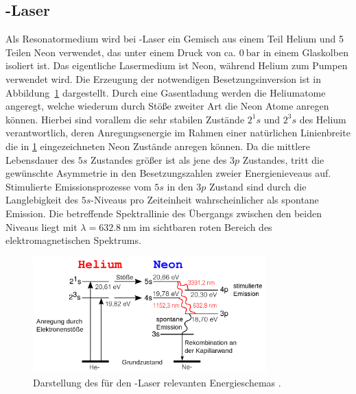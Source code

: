 \subsection{-Laser }
Als Resonatormedium wird bei -Laser ein Gemisch aus einem Teil Helium und 5 Teilen Neon verwendet, das unter einem Druck von
ca. $\SI{0}{\bar}$ in einem Glaskolben isoliert ist. Das eigentliche Lasermedium ist Neon, während Helium zum Pumpen verwendet wird.
Die Erzeugung der notwendigen Besetzungsinversion ist in Abbildung~\ref{fig: energieschema} dargestellt. Durch eine Gasentladung werden
die Heliumatome angeregt, welche wiederum durch Stöße zweiter Art die Neon Atome anregen können. Hierbei sind vorallem die sehr stabilen Zustände
$2^1s$ und $2^3s$ des Helium verantwortlich, deren Anregungsenergie im Rahmen einer natürlichen Linienbreite die in \ref{fig: energieschema}
eingezeichneten Neon Zustände anregen können. Da die mittlere Lebensdauer des $5s$ Zustandes größer ist als jene des $3p$ Zustandes, tritt die gewünschte
Asymmetrie in den Besetzungszahlen zweier Energienieveaus auf. Stimulierte Emissionsprozesse vom $5s$ in den $3p$ Zustand sind durch die Langlebigkeit
des $5s$-Niveaus pro Zeiteinheit wahrscheinlicher als spontane Emission.
Die betreffende Spektrallinie des Übergangs zwischen den beiden Niveaus liegt mit $\lambda = \SI{632.8}{\nano\meter}$ im sichtbaren
roten Bereich des elektromagnetischen Spektrums.
\begin{figure}
  \centering
  \includegraphics[width = 0.8\textwidth]{theorie_bilder/energieschema.png}
  \caption{Darstellung des für den -Laser relevanten Energieschemas \cite{wiki}.}
  \label{fig: energieschema}
\end{figure}
